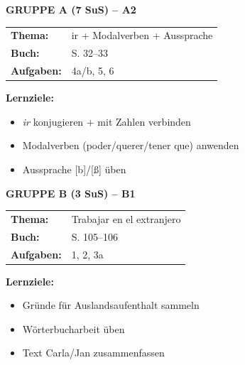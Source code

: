 \documentclass[11pt, a4paper]{article}
\begin{document}


\vspace{1.2cm}


\begin{minipage}[t]{0.48\textwidth}
\textbf{\textcolor{gruppeA}{GRUPPE A (7 SuS) -- A2}}\\[0.2cm]
\begin{tabular}{@{}ll@{}}
\textbf{Thema:} & ir + Modalverben + Aussprache \\
\textbf{Buch:} & S. 32--33 \\
\textbf{Aufgaben:} & 4a/b, 5, 6 \\
\end{tabular}

\vspace{0.2cm}

\textbf{Lernziele:}
\begin{itemize}
\item \textit{ir} konjugieren + mit Zahlen verbinden
\item Modalverben (poder/querer/tener que) anwenden
\item Aussprache [b]/[ß] üben
\end{itemize}
\end{minipage}
\hfill
\begin{minipage}[t]{0.48\textwidth}
\textbf{\textcolor{gruppeB}{GRUPPE B (3 SuS) -- B1}}\\[0.2cm]
\begin{tabular}{@{}ll@{}}
\textbf{Thema:} & Trabajar en el extranjero \\
\textbf{Buch:} & S. 105--106 \\
\textbf{Aufgaben:} & 1, 2, 3a \\
\end{tabular}

\vspace{0.2cm}

\textbf{Lernziele:}
\begin{itemize}
\item Gründe für Auslandsaufenthalt sammeln
\item Wörterbucharbeit üben
\item Text Carla/Jan zusammenfassen
\end{itemize}
\end{minipage}
\end{document}
